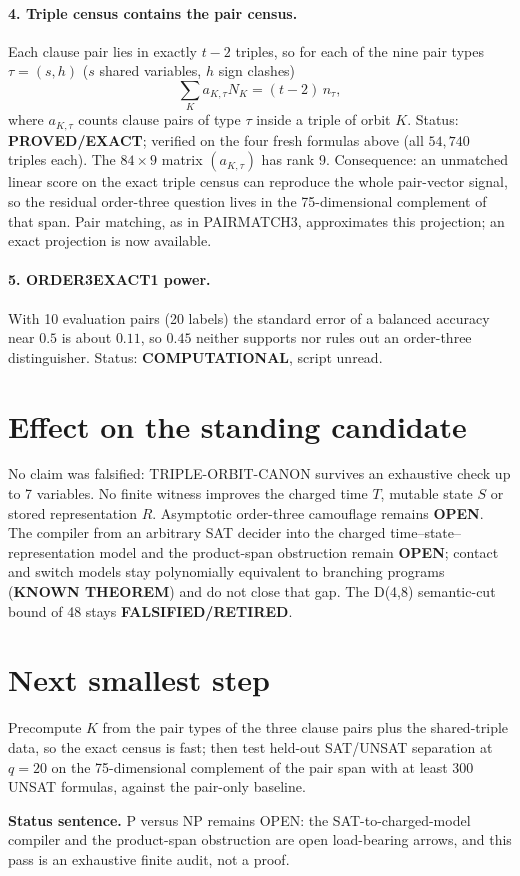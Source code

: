 \documentclass[11pt]{article}
\begin{document}
\paragraph{4. Triple census contains the pair census.} Each clause pair lies in exactly $t-2$ triples, so for each of the nine pair types $\tau=(s,h)$ ($s$ shared variables, $h$ sign clashes)
\[
\sum_K a_{K,\tau}N_K=(t-2)\,n_\tau ,
\]
where $a_{K,\tau}$ counts clause pairs of type $\tau$ inside a triple of orbit $K$. Status: \textbf{PROVED/EXACT}; verified on the four fresh formulas above (all $54{,}740$ triples each). The $84\times9$ matrix $(a_{K,\tau})$ has rank 9.
Consequence: an unmatched linear score on the exact triple census can reproduce the whole pair-vector signal, so the residual order-three question lives in the 75-dimensional complement of that span. Pair matching, as in PAIRMATCH3, approximates this projection; an exact projection is now available.

\paragraph{5. ORDER3EXACT1 power.} With 10 evaluation pairs (20 labels) the standard error of a balanced accuracy near $0.5$ is about $0.11$, so $0.45$ neither supports nor rules out an order-three distinguisher. Status: \textbf{COMPUTATIONAL}, script unread.

\section*{Effect on the standing candidate}
No claim was falsified: TRIPLE-ORBIT-CANON survives an exhaustive check up to 7 variables. No finite witness improves the charged time $T$, mutable state $S$ or stored representation $R$. Asymptotic order-three camouflage remains \textbf{OPEN}. The compiler from an arbitrary SAT decider into the charged time--state--representation model and the product-span obstruction remain \textbf{OPEN}; contact and switch models stay polynomially equivalent to branching programs (\textbf{KNOWN THEOREM}) and do not close that gap. The D(4,8) semantic-cut bound of 48 stays \textbf{FALSIFIED/RETIRED}.

\section*{Next smallest step}
Precompute $K$ from the pair types of the three clause pairs plus the shared-triple data, so the exact census is fast; then test held-out SAT/UNSAT separation at $q=20$ on the 75-dimensional complement of the pair span with at least 300 UNSAT formulas, against the pair-only baseline.

\bigskip
\noindent\textbf{Status sentence.} P versus NP remains OPEN: the SAT-to-charged-model compiler and the product-span obstruction are open load-bearing arrows, and this pass is an exhaustive finite audit, not a proof.
\end{document}
